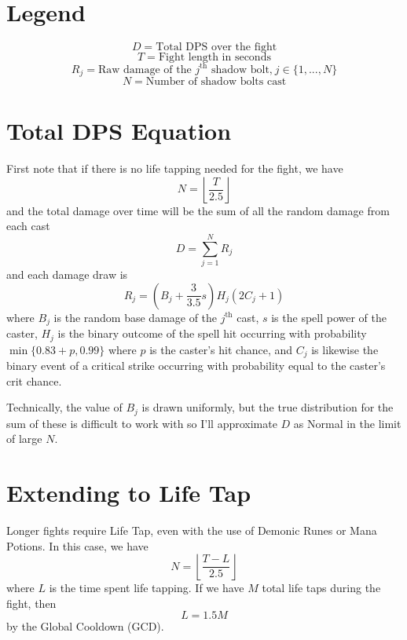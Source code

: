 
\section*{Legend}
$$
D = \text{Total DPS over the fight}
$$
$$
T = \text{Fight length in seconds}
$$
$$
R_j = \text{Raw damage of the $j^\text{th}$ shadow bolt,} \ j \in \{ 1, ..., N \}
$$
$$
N = \text{Number of shadow bolts cast}
$$


\section*{Total DPS Equation}
%
First note that if there is no life tapping needed for the fight, we have
%
$$
N = \left\lfloor \frac{T}{2.5} \right\rfloor
$$
%
and the total damage over time will be the sum of all the random damage from each cast
%
$$
D = \sum_{j=1}^N R_j
$$
%
and each damage draw is
%
$$
R_j = (B_j + \frac{3}{3.5} s) H_j (2 C_j + 1)
$$
%
where $B_j$ is the random base damage of the $j^\text{th}$ cast, $s$ is the spell power of the caster, $H_j$ is the binary outcome of the spell hit occurring with probability $\min \{ 0.83 + p, 0.99 \}$ where $p$ is the caster's hit chance, and $C_j$ is likewise the binary event of a critical strike occurring with probability equal to the caster's crit chance.

Technically, the value of $B_j$ is drawn uniformly, but the true distribution for the sum of these is difficult to work with so I'll approximate $D$ as Normal in the limit of large $N$.



\section*{Extending to Life Tap}
%
Longer fights require Life Tap, even with the use of Demonic Runes or Mana Potions. In this case, we have
%
$$
N = \left\lfloor \frac{T-L}{2.5} \right\rfloor
$$
%
where $L$ is the time spent life tapping. If we have $M$ total life taps during the fight, then
%
$$
L = 1.5 M
$$
%
by the Global Cooldown (GCD).